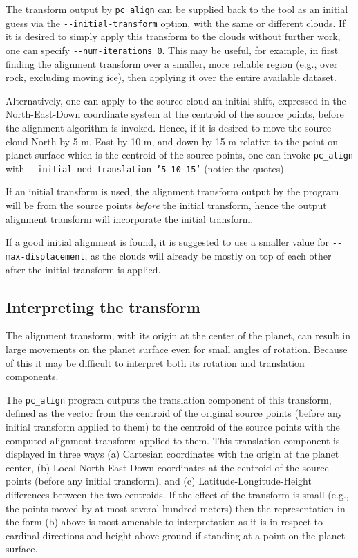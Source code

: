 The transform output by \texttt{pc\_align} can be supplied back to the
tool as an initial guess via the \texttt{-\/-initial-transform} option,
with the same or different clouds. If it is desired to simply apply this
transform to the clouds without further work, one can specify
\texttt{-\/-num-iterations 0}.  This may be useful, for example, in
first finding the alignment transform over a smaller, more reliable
region (e.g., over rock, excluding moving ice), then applying it over the entire
available dataset.

Alternatively, one can apply to the source cloud an initial shift,
expressed in the North-East-Down coordinate system at the centroid of
the source points, before the alignment algorithm is invoked. Hence, if
it is desired to move the source cloud North by 5 m, East by 10 m, and
down by 15 m relative to the point on planet surface which is the
centroid of the source points, one can
invoke \texttt{pc\_align} with \texttt{-\/-initial-ned-translation '5 10
15'} (notice the quotes).

If an initial transform is used, the alignment transform output by the
program will be from the source points \textit{before} the initial transform,
hence the output alignment transform will incorporate the initial transform.

If a good initial alignment is found, it is suggested to use a smaller
value for \texttt{-\/-max-displacement}, as the clouds will already be 
mostly on top of each other after the initial transform is applied.

\subsection{Interpreting the transform}

The alignment transform, with its origin at the center of the planet,
can result in large movements on the planet surface even for small
angles of rotation. Because of this it may be difficult to interpret
both its rotation and translation components.

The \texttt{pc\_align} program outputs the translation component of this
transform, defined as the vector from the centroid of the original
source points (before any initial transform applied to them) to the
centroid of the source points with the computed alignment transform
applied to them. This translation component is displayed in three ways
(a) Cartesian coordinates with the origin at the planet center, (b)
Local North-East-Down coordinates at the centroid of the source points
(before any initial transform), and (c) Latitude-Longitude-Height
differences between the two centroids. If the effect of the transform is
small (e.g., the points moved by at most several hundred meters) then
the representation in the form (b) above is most amenable to
interpretation as it is in respect to cardinal directions and height
above ground if standing at a point on the planet surface.

